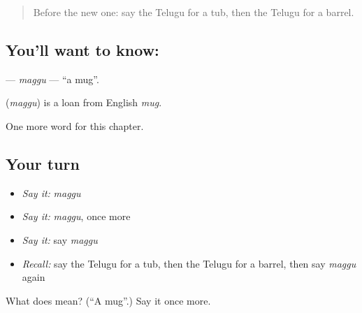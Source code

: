 \label{lesson:TE-C232-maggu}



\begin{quote}
Before the new one: say the Telugu for a tub, then the Telugu for a barrel.
\end{quote}

\subsection*{You'll want to know: }
\textbf{} — \emph{maggu} — \textquotedblleft{}a mug\textquotedblright{}.

\begin{cousinweb}
\textbf{} (\emph{maggu}) is a loan from English \emph{mug}.
\end{cousinweb}

\begin{grammarlens}[title={What you've built}]
One more word for this chapter.
\end{grammarlens}

\subsection*{Your turn}
\begin{itemize}
\raggedright
  \item \emph{Say it:} \emph{maggu}
  \item \emph{Say it:} \emph{maggu}, once more
  \item \emph{Say it:} say \emph{maggu}
  \item \emph{Recall:} say the Telugu for a tub, then the Telugu for a barrel, then say \emph{maggu} again
\end{itemize}

\begin{tcolorbox}[breakable,colback=teal!4,colframe=teal!35!black,title={Before you move on}]
What does  mean? (\textquotedblleft{}A mug\textquotedblright{}.) Say it once more.
\end{tcolorbox}
